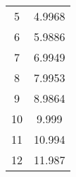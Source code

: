 \begin{table}[!htp]
\begin{tabular}{cc}
		5                  & 4.9968            \\
		6                  & 5.9886            \\
		7                  & 6.9949            \\
		8                  & 7.9953            \\
		9                  & 8.9864            \\
		10                 & 9.999             \\
		11                 & 10.994            \\
		12                 & 11.987            \\
		\bottomrule
	\end{tabular}
\end{table}
